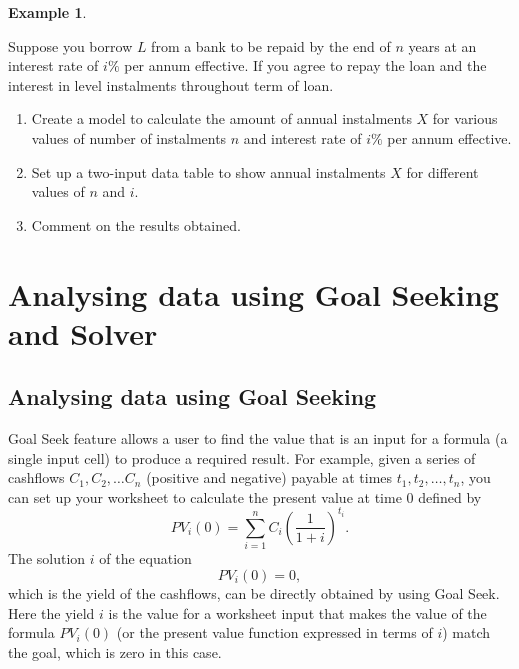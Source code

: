 \documentclass[
]{article}
\theoremstyle{definition}
\theoremstyle{definition}
\newtheorem{example}{Example}[section]
\theoremstyle{definition}
\theoremstyle{definition}
\theoremstyle{remark}
\begin{document}
\begin{example}
\protect\hypertarget{exm:unlabeled-div-12}{}\label{exm:unlabeled-div-12}

Suppose you borrow \(L\) from a bank to be repaid by the end of \(n\) years
at an interest rate of \(i\%\) per annum effective. If you agree to repay
the loan and the interest in level instalments throughout term of loan.

\begin{enumerate}
\def\labelenumi{\arabic{enumi}.}
\item
  Create a model to calculate the amount of annual instalments \(X\) for
  various values of number of instalments \(n\) and interest rate of
  \(i\%\) per annum effective.
\item
  Set up a two-input data table to show annual instalments \(X\) for
  different values of \(n\) and \(i\).
\item
  Comment on the results obtained.
\end{enumerate}

\end{example}

\hypertarget{analysing-data-using-goal-seeking-and-solver}{%
\section{Analysing data using Goal Seeking and Solver}\label{analysing-data-using-goal-seeking-and-solver}}

\hypertarget{analysing-data-using-goal-seeking}{%
\subsection{Analysing data using Goal Seeking}\label{analysing-data-using-goal-seeking}}

Goal Seek feature allows a user to find the value that is an input for a
formula (a single input cell) to produce a required result. For example,
given a series of cashflows \(C_1, C_2, \ldots C_n\) (positive and
negative) payable at times \(t_1, t_2, \ldots, t_n\), you can set up your
worksheet to calculate the present value at time 0 defined by
\[PV_i(0) = \sum_{i=1}^n C_i \left( \frac{1}{1+i} \right)^{t_i}.\] The
solution \(i\) of the equation \[PV_i(0) = 0,\] which is the yield of the
cashflows, can be directly obtained by using Goal Seek. Here the yield
\(i\) is the value for a worksheet input that makes the value of the
formula \(PV_i(0)\) (or the present value function expressed in terms of
\(i\)) match the goal, which is zero in this case.
\end{document}
